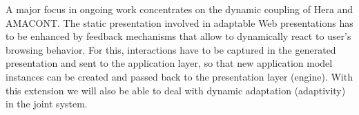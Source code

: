 \documentclass[oribibl]{llncs}
\begin{document}
A major focus in ongoing work concentrates on the dynamic coupling of Hera 
and AMACONT.
The static presentation involved in adaptable Web presentations has to be 
enhanced by feedback mechanisms that allow to dynamically react to user's 
browsing behavior.
For this, interactions have to be captured in the generated presentation and sent to the application layer, so that new application model instances can be created and passed back to the presentation layer (engine).
With this extension we will also be able to deal with dynamic adaptation (adaptivity) in the joint system.



  
\end{document}
